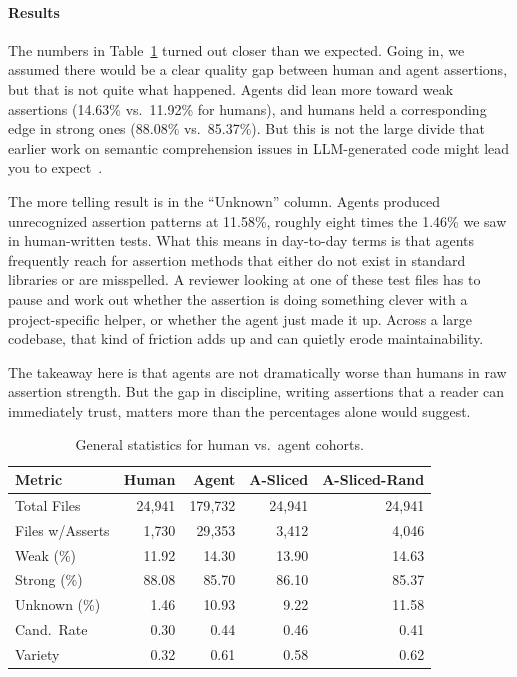 \documentclass[conference]{IEEEtran}
\begin{document}
\paragraph{\textbf{Results}}
The numbers in Table~\ref{tab:general_stats} turned out closer than we expected. Going in, we assumed there would be a clear quality gap between human and agent assertions, but that is not quite what happened. Agents did lean more toward weak assertions (14.63\% vs.\ 11.92\% for humans), and humans held a corresponding edge in strong ones (88.08\% vs.\ 85.37\%). But this is not the large divide that earlier work on semantic comprehension issues in LLM-generated code might lead you to expect~\cite{schafer2023empirical}.

The more telling result is in the ``Unknown'' column. Agents produced unrecognized assertion patterns at 11.58\%, roughly eight times the 1.46\% we saw in human-written tests. What this means in day-to-day terms is that agents frequently reach for assertion methods that either do not exist in standard libraries or are misspelled. A reviewer looking at one of these test files has to pause and work out whether the assertion is doing something clever with a project-specific helper, or whether the agent just made it up. Across a large codebase, that kind of friction adds up and can quietly erode maintainability.
 
The takeaway here is that agents are not dramatically worse than humans in raw assertion strength. But the gap in discipline, writing assertions that a reader can immediately trust, matters more than the percentages alone would suggest.

\begin{table}[t]
\centering
\scriptsize
\caption{General statistics for human vs.\ agent cohorts.}
\label{tab:general_stats}
\begin{tabular}{lrrrr}
\toprule
Metric & Human & Agent & A-Sliced & A-Sliced-Rand \\
\midrule
Total Files & 24{,}941 & 179{,}732 & 24{,}941 & 24{,}941 \\
Files w/Asserts & 1{,}730 & 29{,}353 & 3{,}412 & 4{,}046 \\
Weak (\%) & 11.92 & 14.30 & 13.90 & 14.63 \\
Strong (\%) & 88.08 & 85.70 & 86.10 & 85.37 \\
Unknown (\%) & 1.46 & 10.93 & 9.22 & 11.58 \\
Cand.\ Rate & 0.30 & 0.44 & 0.46 & 0.41 \\
Variety & 0.32 & 0.61 & 0.58 & 0.62 \\
\bottomrule
\end{tabular}
\end{table}
\end{document}
